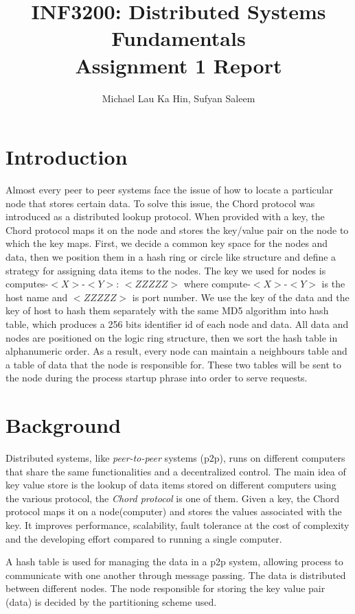 \documentclass[a4paper]{article}
\title{INF3200: Distributed Systems Fundamentals \\
Assignment 1 Report}
\author{Michael Lau Ka Hin, Sufyan Saleem}
\begin{document}
\maketitle

\tableofcontents{}

\section{Introduction}

Almost every peer to peer systems face the issue of how to locate a particular node that stores certain data. To solve this issue, the Chord protocol was introduced as a distributed lookup protocol. When provided with a key, the Chord protocol maps it on the node and stores the key/value pair on the node to which the key maps. First, we decide a common key space for the nodes and data, then we position them in a hash ring or circle like structure and define a strategy for assigning data items to the nodes. The key we used for nodes is computes-$<X>$-$<Y>$: $<ZZZZZ>$ where compute-$<X>$-$<Y>$ is the host name and $<ZZZZZ>$ is port number. We use the key of the data and the key of host to hash them separately with the same MD5 algorithm into hash table, which produces a 256 bits identifier id of each node and data. All data and nodes are positioned on the logic ring structure, then we sort the hash table in alphanumeric order. As a result, every node can maintain a neighbours table and a table of data that the node is responsible for. These two tables will be sent to the node during the process startup phrase into order to serve requests.

\section{Background}

Distributed systems, like \textit{peer-to-peer} systems (p2p), runs on different computers that share the same functionalities and a decentralized control. The main idea of key value store is the lookup of data items stored on different computers using the various protocol, the \textit{Chord protocol} is one of them. Given a key, the Chord protocol maps it on a node(computer) and stores the values associated with the key. It improves performance, scalability, fault tolerance at the cost of complexity and the developing effort compared to running a single computer. 

A hash table is used for managing the data in a p2p system, allowing process to communicate with one another through message passing. The data is distributed between different nodes. The node responsible for storing the key value pair (data) is decided by the partitioning scheme used.  
\end{document}
